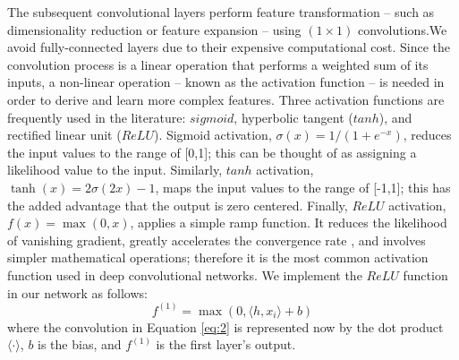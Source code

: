 \documentclass[final,3p,times,twocolumn,authoryear]{elsarticle}
\begin{document}
The subsequent convolutional layers perform feature transformation -- such as dimensionality reduction or feature expansion -- using $(1\times1)$ convolutions.We avoid fully-connected layers due to their expensive computational cost. 
Since the convolution process is a linear operation that performs a weighted sum of its inputs, a non-linear operation -- known as the activation function -- is needed in order to derive and learn more complex features. 
Three activation functions are frequently used in the literature: $sigmoid$, hyperbolic tangent ($tanh$), and rectified linear unit ($ReLU$). 
Sigmoid activation, \(\sigma(x)=1/(1+e^{-x})\), reduces the input values to the range of [0,1]; this can be thought of as assigning a likelihood value to the input. 
Similarly, $tanh$ activation, \(\tanh(x) = 2 \sigma(2x) -1\), maps the input values to the range of [-1,1]; this has the added advantage that the output is zero centered. 
Finally, $ReLU$ activation, $f(x) = \max(0, x)$, applies a simple ramp function. 
It reduces the likelihood of vanishing gradient, greatly accelerates the convergence rate \citep{Alex_NIPS2012}, and involves simpler mathematical operations; therefore it is the most common activation function used in deep convolutional networks.  
We implement the $ReLU$ function in our network as follows:
\begin{equation}
\label{eq:2}
f^{(1)} = \max(0,\langle h, x_{i} \rangle +b)
\end{equation}
where the convolution in Equation \ref{eq:2} is represented now by the dot product $\langle \cdot \rangle$, $b$ is the bias, and $f^{(1)}$ is the first layer's output. 
\end{document}
